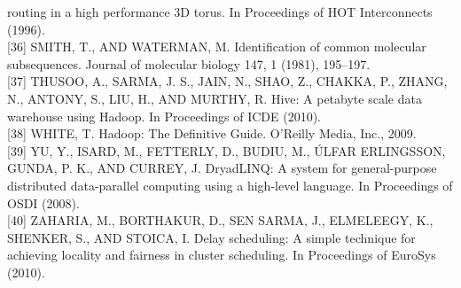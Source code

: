 \documentclass[
]{article}
\begin{document}
routing in a high performance 3D torus. In Proceedings of HOT
Interconnects (1996).\\
{[}36{]} SMITH, T., AND WATERMAN, M. Identification of common molecular
subsequences. Journal of molecular biology 147, 1 (1981), 195--197.\\
{[}37{]} THUSOO, A., SARMA, J. S., JAIN, N., SHAO, Z., CHAKKA, P.,
ZHANG, N., ANTONY, S., LIU, H., AND MURTHY, R. Hive: A petabyte scale
data warehouse using Hadoop. In Proceedings of ICDE (2010).\\
{[}38{]} WHITE, T. Hadoop: The Definitive Guide. O'Reilly Media, Inc.,
2009.\\
{[}39{]} YU, Y., ISARD, M., FETTERLY, D., BUDIU, M., ÚLFAR ERLINGSSON,
GUNDA, P. K., AND CURREY, J. DryadLINQ: A system for general-purpose
distributed data-parallel computing using a high-level language. In
Proceedings of OSDI (2008).\\
{[}40{]} ZAHARIA, M., BORTHAKUR, D., SEN SARMA, J., ELMELEEGY, K.,
SHENKER, S., AND STOICA, I. Delay scheduling: A simple technique for
achieving locality and fairness in cluster scheduling. In Proceedings of
EuroSys (2010).
\end{document}
